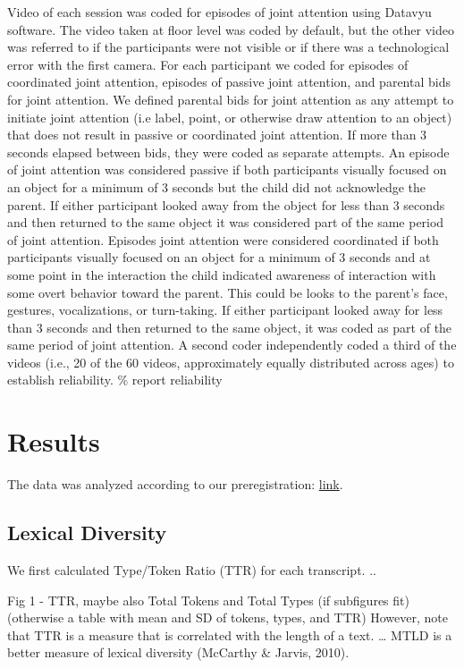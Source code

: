 \documentclass[10pt, letterpaper]{article}
\begin{document}
Video of each session was coded for episodes of joint attention using
Datavyu software. The video taken at floor level was coded by default,
but the other video was referred to if the participants were not visible
or if there was a technological error with the first camera. For each
participant we coded for episodes of coordinated joint attention,
episodes of passive joint attention, and parental bids for joint
attention. We defined parental bids for joint attention as any attempt
to initiate joint attention (i.e label, point, or otherwise draw
attention to an object) that does not result in passive or coordinated
joint attention. If more than 3 seconds elapsed between bids, they were
coded as separate attempts. An episode of joint attention was considered
passive if both participants visually focused on an object for a minimum
of 3 seconds but the child did not acknowledge the parent. If either
participant looked away from the object for less than 3 seconds and then
returned to the same object it was considered part of the same period of
joint attention. Episodes joint attention were considered coordinated if
both participants visually focused on an object for a minimum of 3
seconds and at some point in the interaction the child indicated
awareness of interaction with some overt behavior toward the parent.
This could be looks to the parent's face, gestures, vocalizations, or
turn-taking. If either participant looked away for less than 3 seconds
and then returned to the same object, it was coded as part of the same
period of joint attention. A second coder independently coded a third of
the videos (i.e., 20 of the 60 videos, approximately equally distributed
across ages) to establish reliability. \% report reliability

\section{Results}\label{results}

The data was analyzed according to our preregistration:
\href{https://osf.io/2bpdf/}{link}.

\subsection{Lexical Diversity}\label{lexical-diversity}

We first calculated Type/Token Ratio (TTR) for each transcript. ..

Fig 1 - TTR, maybe also Total Tokens and Total Types (if subfigures fit)
(otherwise a table with mean and SD of tokens, types, and TTR) However,
note that TTR is a measure that is correlated with the length of a text.
\ldots{} MTLD is a better measure of lexical diversity (McCarthy \&
Jarvis, 2010).
\end{document}

